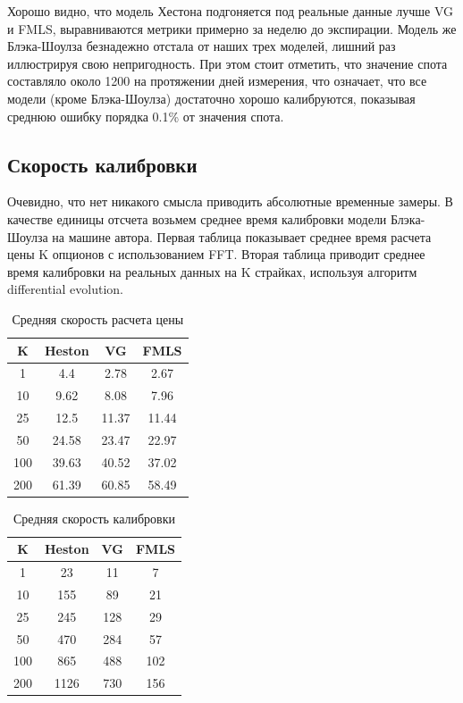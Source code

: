 \documentclass[oneside, final, 12pt, a4paper]{article}
\begin{document}
Хорошо видно, что модель Хестона подгоняется под реальные данные лучше VG и FMLS, выравниваются метрики примерно за неделю до экспирации. Модель же Блэка-Шоулза безнадежно отстала от наших трех моделей, лишний раз иллюстрируя свою непригодность. При этом стоит отметить, что значение спота составляло около 1200 на протяжении дней измерения, что означает, что все модели (кроме Блэка-Шоулза) достаточно хорошо калибруются, показывая среднюю ошибку порядка 0.1\% от значения спота.

\newpage
\subsection{Скорость калибровки}
Очевидно, что нет никакого смысла приводить абсолютные временные замеры. В качестве единицы отсчета возьмем среднее время калибровки модели Блэка-Шоулза на машине автора. Первая таблица показывает среднее время расчета цены K опционов с использованием FFT\cite{FFT:paper}. Вторая таблица приводит среднее время калибровки на реальных данных на K страйках, используя алгоритм differential evolution\cite{DE:paper1}.

\label{speed:label}

\begin{table}[h!]
  \begin{center}
    \caption{Средняя скорость расчета цены}
    \label{tab:table1}
    \begin{tabular}{c|c|c|c}
      \textbf{K} & \textbf{Heston} & \textbf{VG} & \textbf{FMLS}\\
      \hline
      1   & 4.4 & 2.78 & 2.67\\
      10  & 9.62 & 8.08 & 7.96\\
      25  & 12.5 & 11.37 & 11.44\\
      50  & 24.58 & 23.47 & 22.97\\
      100 & 39.63 & 40.52 & 37.02\\
      200 & 61.39 & 60.85 & 58.49\\
    \end{tabular}
  \end{center}
\end{table}

\begin{table}[h!]
  \begin{center}
    \caption{Средняя скорость калибровки}
    \label{tab:table2}
    \begin{tabular}{c|c|c|c}
      \textbf{K} & \textbf{Heston} & \textbf{VG} & \textbf{FMLS}\\
      \hline
      1   & 23 & 11 & 7 \\
      10  & 155 & 89 & 21\\
      25  & 245 & 128 & 29\\
      50  & 470 & 284 & 57\\
      100 & 865 & 488 & 102\\
      200 & 1126 & 730 & 156\\
    \end{tabular}
  \end{center}
\end{table}
\end{document}
